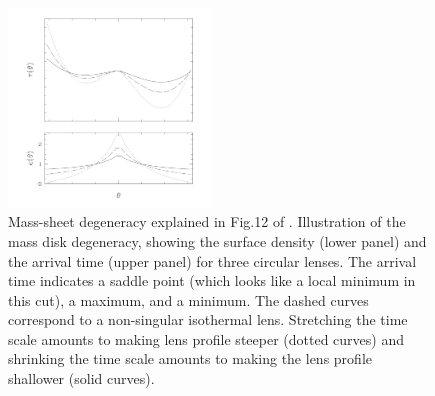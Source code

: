 \documentclass{cosmo}
\begin{document}
    \begin{figure}[h]
        \centering
        \includegraphics[width=0.48\textwidth]{fig4_2.png}
        \caption{Mass-sheet degeneracy explained in Fig.12 of \cite{Courbin2002}. Illustration of the mass disk degeneracy, showing the surface density (lower panel) and the arrival time (upper panel) for three circular lenses. The arrival time indicates a saddle point (which looks like a local minimum in this cut), a maximum, and a minimum. The dashed curves correspond to a non-singular isothermal lens. Stretching the time scale amounts to making lens profile steeper (dotted curves) and shrinking the time scale amounts to making the lens profile shallower (solid curves).}
        \label{fig4}
    \end{figure}
    
\end{document}
